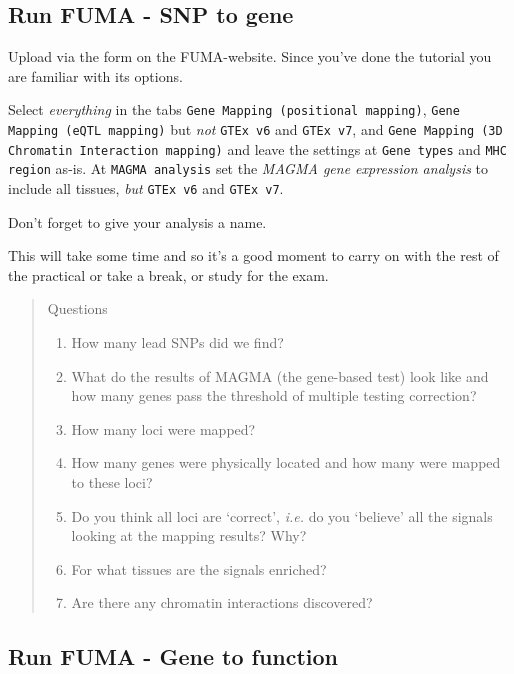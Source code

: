 \documentclass[
]{book}
\newcommand{\passthrough}[1]{#1}
\providecommand{\tightlist}{%
  \setlength{\itemsep}{0pt}\setlength{\parskip}{0pt}}
\begin{document}
\hypertarget{run-fuma---snp-to-gene}{%
\subsection{Run FUMA - SNP to gene}\label{run-fuma---snp-to-gene}}

Upload via the form on the FUMA-website. Since you've done the tutorial you are familiar with its options.

Select \emph{everything} in the tabs \passthrough{\lstinline!Gene Mapping (positional mapping)!}, \passthrough{\lstinline!Gene Mapping (eQTL mapping)!} but \emph{not} \passthrough{\lstinline!GTEx v6!} and \passthrough{\lstinline!GTEx v7!}, and \passthrough{\lstinline!Gene Mapping (3D Chromatin Interaction mapping)!} and leave the settings at \passthrough{\lstinline!Gene types!} and \passthrough{\lstinline!MHC region!} as-is. At \passthrough{\lstinline!MAGMA analysis!} set the \emph{MAGMA gene expression analysis} to include all tissues, \emph{but} \passthrough{\lstinline!GTEx v6!} and \passthrough{\lstinline!GTEx v7!}.

Don't forget to give your analysis a name.

This will take some time and so it's a good moment to carry on with the rest of the practical or take a break, or study for the exam.

\begin{quote}
Questions

\begin{enumerate}
\def\labelenumi{\arabic{enumi}.}
\tightlist
\item
  How many lead SNPs did we find?
\item
  What do the results of MAGMA (the gene-based test) look like and how many genes pass the threshold of multiple testing correction?
\item
  How many loci were mapped?
\item
  How many genes were physically located and how many were mapped to these loci?
\item
  Do you think all loci are `correct', \emph{i.e.} do you `believe' all the signals looking at the mapping results? Why?
\item
  For what tissues are the signals enriched?
\item
  Are there any chromatin interactions discovered?
\end{enumerate}
\end{quote}

\hypertarget{run-fuma---gene-to-function}{%
\subsection{Run FUMA - Gene to function}\label{run-fuma---gene-to-function}}
\end{document}
